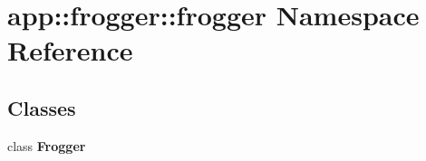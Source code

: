 \section{app::frogger::frogger Namespace Reference}
\label{namespaceapp_1_1frogger_1_1frogger}


\subsection*{Classes}
\begin{CompactItemize}
\item 
class {\bf Frogger}
\end{CompactItemize}
